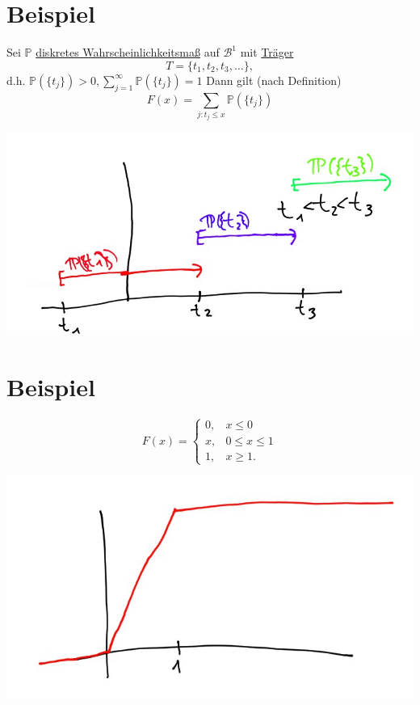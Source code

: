 \documentclass[a4paper,11pt,notitlepage]{report}
\newcommand{\Prim}{{\ensuremath{\mathbb{P}}}}
\begin{document}
\section{Beispiel}
Sei $\Prim$ \underline{diskretes Wahrscheinlichkeitsmaß} auf $\mathcal{B}^1$ mit \underline{Träger}
$$T = \{ t_1, t_2, t_3, \ldots \},$$
d.h. $\Prim(\{t_j\}) > 0, \sum\limits_{j=1}^\infty{\Prim(\{t_j\})} = 1$
\newline
Dann gilt (nach Definition)
$$F(x) = \sum\limits_{j \colon t_j \leq x}{\Prim(\{t_j\})}$$
\begin{center}
\includegraphics[scale=0.4]{bild2.jpg}
\end{center}

\section{Beispiel}
$$F(x) = \begin{cases} 0, & x \leq 0 \\ x, & 0 \leq x \leq 1 \\ 1, & x \geq 1. \end{cases}$$
\begin{center}
	\includegraphics[scale=0.4]{bild3.jpg}
\end{center}
\end{document}
